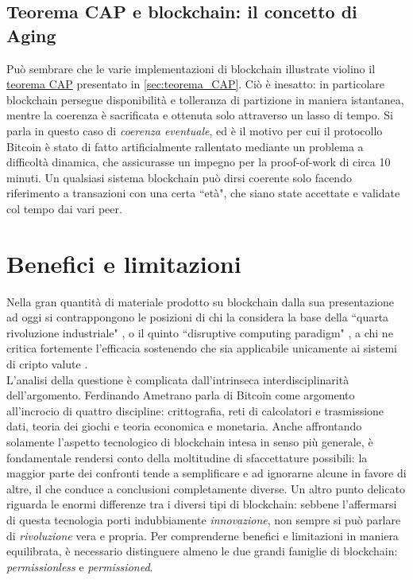 	\subsection{Teorema CAP e blockchain: il concetto di Aging}
		Può sembrare che le varie implementazioni di blockchain illustrate violino il \hyperref[sec:teorema_CAP]{teorema CAP} presentato in \ref{sec:teorema_CAP}. Ciò è inesatto: in particolare blockchain persegue disponibilità e tolleranza di partizione in maniera istantanea, mentre la coerenza è sacrificata e ottenuta solo attraverso un lasso di tempo. Si parla in questo caso di \emph{coerenza eventuale}, ed è il motivo per cui il protocollo Bitcoin è stato di fatto artificialmente rallentato mediante un problema a difficoltà dinamica, che assicurasse un impegno per la proof-of-work di circa 10 minuti. Un qualsiasi sistema blockchain può dirsi coerente solo facendo riferimento a transazioni con una certa ``età", che siano state accettate e validate col tempo dai vari peer.

\section{Benefici e limitazioni}
	Nella gran quantità di materiale prodotto su blockchain dalla sua presentazione ad oggi si contrappongono le posizioni di chi la considera la base della ``quarta rivoluzione industriale" \cite{4industrialrevo}, o il quinto ``disruptive computing paradigm" \cite{blockchain_swan}, a chi ne critica fortemente l'efficacia sostenendo che sia applicabile unicamente ai sistemi di cripto valute \cite{what_is_it_good_for}. \\
	L'analisi della questione è complicata dall'intrinseca interdisciplinarità dell'argomento. Ferdinando Ametrano parla di Bitcoin \cite{Ametrano_slides} come argomento all'incrocio di quattro discipline: crittografia, reti di calcolatori e trasmissione dati, teoria dei giochi e teoria economica e monetaria. Anche affrontando solamente l'aspetto tecnologico di blockchain intesa in senso più generale, è fondamentale rendersi conto della moltitudine di sfaccettature possibili: la maggior parte dei confronti tende a semplificare e ad ignorarne alcune in favore di altre, il che conduce a conclusioni completamente diverse. Un altro punto delicato riguarda le enormi differenze tra i diversi tipi di blockchain: sebbene l'affermarsi di questa tecnologia porti indubbiamente \emph{innovazione}, non sempre si può parlare di \emph{rivoluzione} vera e propria. Per comprenderne benefici e limitazioni in maniera equilibrata, è necessario distinguere almeno le due grandi famiglie di blockchain: \emph{permissionless} e \emph{permissioned}.

